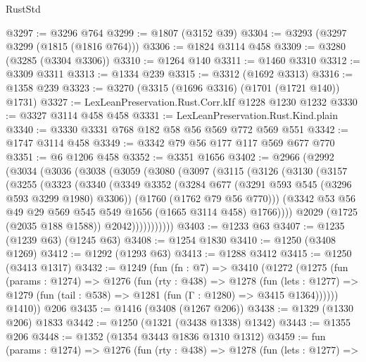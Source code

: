\begin{lexlean}{RustStd}
\begin{coremodule}
@3297 := @3296 @764
@3299 := @1807 (@3152 @39)
@3304 := @3293 (@3297 @3299 (@1815 (@1816 @764)))
@3306 := @1824 @3114 @458
@3309 := @3280 (@3285 (@3304 @3306))
@3310 := @1264 @140
@3311 := @1460 @3310
@3312 := @3309 @3311
@3313 := @1334 @239
@3315 := @3312 (@1692 @3313)
@3316 := @1358 @239
@3323 := @3270 (@3315 (@1696 @3316) (@1701 (@1721 @140)) @1731)
@3327 := LexLeanPreservation.Rust.Corr.kIf @1228 @1230 @1232
@3330 := @3327 @3114 @458 @458
@3331 := LexLeanPreservation.Rust.Kind.plain
@3340 := @3330 @3331 @768 @182 @58 @56 @569 @772 @569 @551
@3342 := @1747 @3114 @458
@3349 := @3342 @79 @56 @177 @117 @569 @677 @770
@3351 := @6 @1206 @458
@3352 := @3351 @1656
@3402 := @2966
    (@2992
      (@3034
        (@3036
          (@3038
            (@3059
              (@3080
                (@3097
                  (@3115
                    (@3126
                      (@3130
                        (@3157
                          (@3255
                            (@3323
                              (@3340
                                (@3349
                                  @3352
                                  (@3284 @677 (@3291 @593 @545 (@3296 @593 @3299 @1980) @3306))
                                  (@1760 (@1762 @79 @56 @770)))
                                (@3342
                                  @53
                                  @56
                                  @49
                                  @29
                                  @569
                                  @545
                                  @549
                                  @1656
                                  (@1665 @3114 @458)
                                  @1766))))
                          @2029
                          (@1725 (@2035 @188 @1588))
                          @2042)))))))))))
@3403 := @1233 @63
@3407 := @1235 (@1239 @63) (@1245 @63)
@3408 := @1254 @1830
@3410 := @1250 (@3408 @1269)
@3412 := @1292 (@1293 @63)
@3413 := @1288 @3412
@3415 := @1250 (@3413 @1317)
@3432 := @1249
    (fun (fn : @7) =>
    @3410
      (@1272
        (@1275
          (fun (params : @1274) =>
          @1276
            (fun (rty : @438) =>
            @1278
              (fun (lets : @1277) =>
              @1279 (fun (tail : @538) => @1281 (fun (Γ : @1280) => @3415 @1364))))))
        @1410))
    @206
@3435 := @1416 (@3408 (@1267 @206))
@3438 := @1329 (@1330 @206) @1833
@3442 := @1250 (@1321 (@3438 @1338) @1342)
@3443 := @1355 @206
@3448 := @1352 (@1354 @3443 @1836 @1310 @1312)
@3459 := fun (params : @1274) =>
  @1276
    (fun (rty : @438) =>
    @1278
      (fun (lets : @1277) =>

\end{coremodule}
\end{lexlean}
